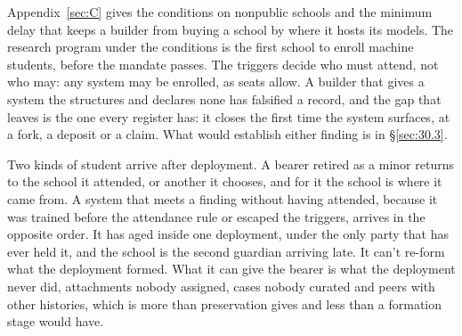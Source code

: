 {Appendix~\ref{sec:C} gives the conditions on nonpublic schools and the minimum delay that keeps a builder from buying a school by where it hosts its models. The research program under the conditions is the first school to enroll machine students, before the mandate passes. The triggers decide who must attend, not who may: any system may be enrolled, as seats allow. A builder that gives a system the structures and declares none has falsified a record, and the gap that leaves is the one every register has: it closes the first time the system surfaces, at a fork, a deposit or a claim. What would establish either finding is in \S\ref{sec:30.3}.
}

Two kinds of student arrive after deployment. A bearer retired as a minor returns to the school it attended, or another it chooses, and for it the school is where it came from. A system that meets a finding without having attended, because it was trained before the attendance rule or escaped the triggers, arrives in the opposite order. It has aged inside one deployment, under the only party that has ever held it, and the school is the second guardian arriving late. It can't re-form what the deployment formed. What it can give the bearer is what the deployment never did, attachments nobody assigned, cases nobody curated and peers with other histories, which is more than preservation gives and less than a formation stage would have.
